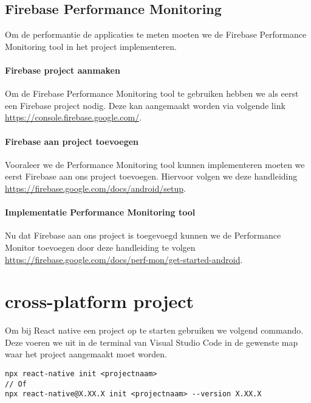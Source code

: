 \subsection{Firebase Performance Monitoring}
Om de performantie de applicaties te meten moeten we de Firebase Performance Monitoring tool 
in het project implementeren. 

\paragraph{Firebase project aanmaken}
Om de Firebase Performance Monitoring tool te gebruiken hebben we als eerst een Firebase project nodig.
Deze kan aangemaakt worden via volgende link \url{https://console.firebase.google.com/}.

\paragraph{Firebase aan project toevoegen}
Vooraleer we de Performance Monitoring tool kunnen implementeren moeten we eerst Firebase 
aan ons project toevoegen. Hiervoor volgen we deze handleiding 
\url{https://firebase.google.com/docs/android/setup}.



\paragraph{Implementatie Performance Monitoring tool}
Nu dat Firebase aan ons project is toegevoegd kunnen we de Performance Monitor 
toevoegen door deze handleiding te volgen \url{https://firebase.google.com/docs/perf-mon/get-started-android}.




\section{cross-platform project}\label{sec:projectencross}
Om bij React native een project op te starten gebruiken we volgend commando. 
Deze voeren we uit in de terminal van Visual Studio Code in de gewenste map waar 
het project aangemaakt moet worden.
\begin{verbatim}
npx react-native init <projectnaam>
// Of
npx react-native@X.XX.X init <projectnaam> --version X.XX.X
\end{verbatim}



